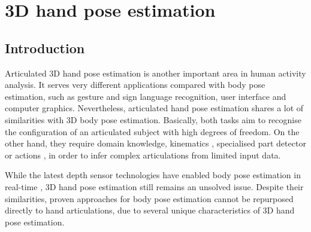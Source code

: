 \chapter{3D hand pose estimation}
\label{chap/hand}

\section{Introduction}

Articulated 3D hand pose estimation is another important area in human activity analysis. 
It serves very different applications compared with body pose estimation, such as gesture and sign language recognition, user interface and computer graphics.
Nevertheless, articulated hand pose estimation shares a lot of similarities with 3D body pose estimation. Basically, both tasks aim to recognise the configuration of an articulated subject with high degrees of freedom. On the other hand, they require domain knowledge, \eg kinematics \cite{LaGorce2011, Simo-Serra2012}, specialised part detector \cite{Bissacco2007} or actions \cite{Yao2012}, in order to infer complex articulations from limited input data. 

While the latest depth sensor technologies have enabled body pose estimation in real-time \cite{Baak2011, Shotton2011, Girshick2011, Sun2012}, 3D hand pose estimation still remains an unsolved issue. Despite their similarities, proven approaches for body pose estimation cannot be repurposed directly to hand articulations, due to several unique characteristics of 3D hand pose estimation.  

